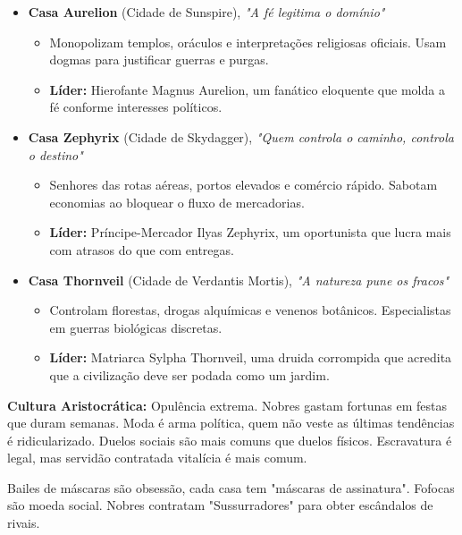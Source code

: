 \begin{itemize}
    \item \textbf{\ringmfamily Casa Aurelion} (Cidade de Sunspire), \textit{"A fé legitima o domínio"}
    \begin{itemize}
        \item Monopolizam templos, oráculos e interpretações religiosas oficiais. Usam dogmas para justificar guerras e purgas.
        \item \textbf{\ringmfamily Líder:} Hierofante Magnus Aurelion, um fanático eloquente que molda a fé conforme interesses políticos.
    \end{itemize}
    
    \item \textbf{\ringmfamily Casa Zephyrix} (Cidade de Skydagger), \textit{"Quem controla o caminho, controla o destino"}
    \begin{itemize}
        \item Senhores das rotas aéreas, portos elevados e comércio rápido. Sabotam economias ao bloquear o fluxo de mercadorias.
        \item \textbf{\ringmfamily Líder:} Príncipe-Mercador Ilyas Zephyrix, um oportunista que lucra mais com atrasos do que com entregas.
    \end{itemize}
    
    \item \textbf{\ringmfamily Casa Thornveil} (Cidade de Verdantis Mortis), \textit{"A natureza pune os fracos"}
    \begin{itemize}
        \item Controlam florestas, drogas alquímicas e venenos botânicos. Especialistas em guerras biológicas discretas.
        \item \textbf{\ringmfamily Líder:} Matriarca Sylpha Thornveil, uma druida corrompida que acredita que a civilização deve ser podada como um jardim.
    \end{itemize}

\end{itemize}

\textbf{\ringmfamily Cultura Aristocrática:}
Opulência extrema. Nobres gastam fortunas em festas que duram semanas. Moda é arma política, quem não veste as últimas tendências é ridicularizado. Duelos sociais são mais comuns que duelos físicos. Escravatura é legal, mas servidão contratada vitalícia é mais comum.

Bailes de máscaras são obsessão, cada casa tem "máscaras de assinatura". Fofocas são moeda social. Nobres contratam "Sussurradores" para obter escândalos de rivais.

